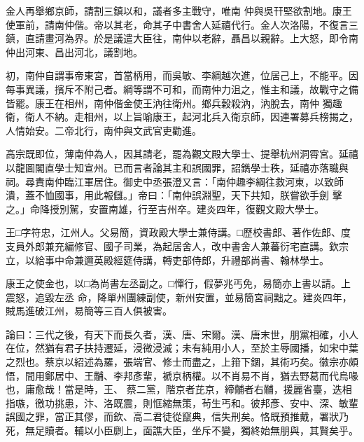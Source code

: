 \begin{pinyinscope}
 金人再舉鄉京師，請割三鎮以和，議者多主戰守，唯南
 仲與吳幵堅欲割地。康王使軍前，請南仲偕。帝以其老，命其子中書舍人延禧代行。金人次洛陽，不復言三鎮，直請畫河為界。於是議遣大臣往，南仲以老辭，聶昌以親辭。上大怒，即令南仲出河東、昌出河北，議割地。



 初，南仲自謂事帝東宮，首當柄用，而吳敏、李綱越次進，位居己上，不能平。因每事異議，擯斥不附己者。綱等謂不可和，而南仲力沮之，惟主和議，故戰守之備皆罷。康王在相州，南仲偕金使王汭往衛州。鄉兵穀殺汭，汭脫去，南仲
 獨趣衛，衛人不納。走相州，以上旨喻康王，起河北兵入衛京師，因連署募兵榜揭之，人情始安。二帝北行，南仲與文武官吏勸進。



 高宗既即位，薄南仲為人，因其請老，罷為觀文殿大學士、提舉杭州洞霄宮。延禧以龍圖閣直學士知宣州。已而言者論其主和誤國罪，詔鐫學士秩，延禧亦落職與祠。尋責南仲臨江軍居住。御史中丞張澄又言：「南仲趣李綱往救河東，以致師潰，蓋不恤國事，用此報讎。」帝曰：「南仲誤淵聖，天下共知，朕嘗欲手劍
 擊之。」命降授別駕，安置南雄，行至吉州卒。建炎四年，復觀文殿大學士。



 王□字符忠，江州人。父易簡，資政殿大學士兼侍講。□歷校書郎、著作佐郎、度支員外郎兼充編修官、國子司業，為起居舍人，改中書舍人兼蕃衍宅直講。欽宗立，以給事中命兼邇英殿經筵侍講，轉吏部侍郎，升禮部尚書、翰林學士。



 康王之使金也，以□為尚書左丞副之。□憚行，假夢兆丐免，易簡亦上書以請。上震怒，追毀左丞
 命，降單州團練副使，新州安置，並易簡宮祠黜之。建炎四年，賊馬進破江州，易簡等三百人俱被害。



 論曰：三代之後，有天下而長久者，漢、唐、宋爾。漢、唐末世，朋黨相確，小人在位，然猶有君子扶持遷延，浸微浸滅；未有純用小人，至於主辱國播，如宋中葉之烈也。蔡京以紹述為羅，張端官、修士而盡之，上箝下錮，其術巧矣。徽宗亦頗悟，間用鄭居中、王黼、李邦彥輩，褫京柄權。以不肖易不肖，猶去野葛而代烏喙也，庸愈哉！當是時，王、
 蔡二黨，階京者芘京，締黼者右黼，援麗省臺，迭相指嗾，徼功挑患，汴、洛既震，則恇縮無策，茍生丐和。彼邦彥、安中、深、敏輩誤國之罪，當正其僇，而欽、高二君徒從竄典，信失刑矣。恪既預推戴，署狀乃死，無足贖者。輔以小臣劘上，面譙大臣，坐斥不變，獨終始無朋與，其賢矣乎。



\end{pinyinscope}